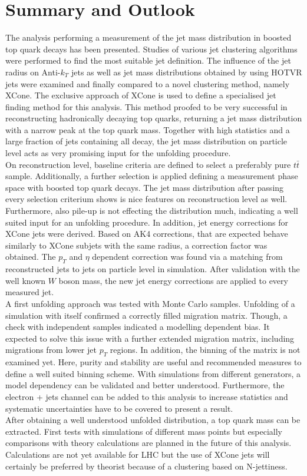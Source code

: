 \chapter{Summary and Outlook}

	The analysis performing a measurement of the jet mass distribution in boosted top quark decays has been presented. Studies of various jet clustering algorithms were performed to find the most suitable jet definition. The influence of the jet radius on Anti-$k_T$ jets as well as jet mass distributions obtained by using HOTVR jets were examined and finally compared to a novel clustering method, namely XCone. The exclusive approach of XCone is used to define a specialised jet finding method for this analysis. This method proofed to be very successful in reconstructing hadronically decaying top quarks, returning a jet mass distribution with a narrow peak at the top quark mass. Together with high statistics and a large fraction of jets containing all decay, the jet mass distribution on particle level acts as very promising input for the unfolding procedure. \\
	On reconstruction level, baseline criteria are defined to select a preferably pure $t\bar{t}$ sample. Additionally, a further selection is applied defining a measurement phase space with boosted top quark decays. The jet mass distribution after passing every selection criterium shows is nice features on reconstruction level as well. Furthermore, also pile-up is not effecting the distribution much, indicating a well suited input for an unfolding procedure. In addition, jet energy corrections for XCone jets were derived. Based on AK4 corrections, that are expected behave similarly to XCone subjets with the same radius, a correction factor was obtained. The $p_T$ and $\eta$ dependent correction was found via a matching from reconstructed jets to jets on particle level in simulation. After validation with the well known $W$ boson mass, the new jet energy corrections are applied to every measured jet.\\	
	A first unfolding approach was tested with Monte Carlo samples. Unfolding of a simulation with itself confirmed a correctly filled migration matrix. Though, a check with independent samples indicated a modelling dependent bias. It expected to solve this issue with a further extended migration matrix, including migrations from lower jet $p_T$ regions. In addition, the binning of the matrix is not examined yet. Here, purity and stability are useful and recommended measures to define a well suited binning scheme. With simulations from different generators, a model dependency can be validated and better understood. Furthermore, the electron + jets channel can be added to this analysis to increase statistics and systematic uncertainties have to be covered to present a result. \\
	After obtaining a well understood unfolded distribution, a top quark mass can be extracted. First tests with simulations of different mass points but especially comparisons with theory calculations are planned in the future of this analysis. Calculations are not yet available for LHC but the use of XCone jets will certainly be preferred by theorist because of a clustering based on N-jettiness.
